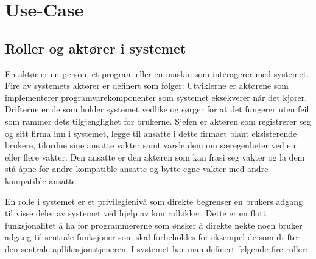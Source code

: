 \chapter{Use-Case}

\section{Roller og aktører i systemet}

En aktør er en person, et program eller en maskin som interagerer med systemet. Fire av systemets aktører er definert som følger: Utviklerne er aktørene som implementerer programvarekomponenter som systemet eksekverer når det kjører. Drifterne er de som holder systemet vedlike og sørger for at det fungerer uten feil som rammer dets tilgjenglighet for brukerne. Sjefen er aktøren som registrerer seg og sitt firma inn i systemet, legge til ansatte i dette firmaet blant eksisterende brukere, tilordne sine ansatte vakter samt varsle dem om særegenheter ved en eller flere vakter. Den ansatte er den aktøren som kan frasi seg vakter og la dem stå åpne for andre kompatible ansatte og bytte egne vakter med andre kompatible ansatte.\par
En rolle i systemet er et privilegienivå som direkte begrenser en brukers adgang til visse deler av systemet ved hjelp av kontrolløkker. Dette er en flott funksjonalitet å ha for programmererne som ønsker å direkte nekte noen bruker adgang til sentrale funksjoner som skal forbeholdes for eksempel de som drifter den sentrale apllikasjonstjeneren. I systemet har man definert følgende fire roller:
\\
